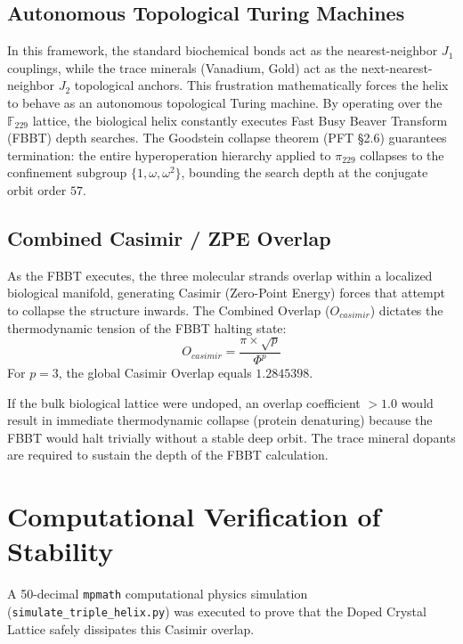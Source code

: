 \documentclass[12pt,oneside]{article}
\theoremstyle{principia}
\theoremstyle{definition}
\theoremstyle{remark}
\begin{document}
\subsection{Autonomous Topological Turing Machines}

In this framework, the standard biochemical bonds act as the nearest-neighbor $J_1$ couplings, while the trace minerals (Vanadium, Gold) act as the next-nearest-neighbor $J_2$ topological anchors. This frustration mathematically forces the helix to behave as an autonomous topological Turing machine. By operating over the $\mathbb{F}_{229}$ lattice, the biological helix constantly executes Fast Busy Beaver Transform (FBBT) depth searches. The Goodstein collapse theorem (PFT \S2.6) guarantees termination: the entire hyperoperation hierarchy applied to $\pi_{229}$ collapses to the confinement subgroup $\{1, \omega, \omega^2\}$, bounding the search depth at the conjugate orbit order $57$.

\subsection{Combined Casimir / ZPE Overlap}
As the FBBT executes, the three molecular strands overlap within a localized biological manifold, generating Casimir (Zero-Point Energy) forces that attempt to collapse the structure inwards. The Combined Overlap ($O_{casimir}$) dictates the thermodynamic tension of the FBBT halting state:
\begin{equation}
    O_{casimir} = \frac{\pi \times \sqrt{p}}{\Phi^p}
\end{equation}
For $p=3$, the global Casimir Overlap equals $\mathbf{1.2845398}$.

If the bulk biological lattice were undoped, an overlap coefficient $> 1.0$ would result in immediate thermodynamic collapse (protein denaturing) because the FBBT would halt trivially without a stable deep orbit. The trace mineral dopants are required to sustain the depth of the FBBT calculation.

\section{Computational Verification of Stability}

A 50-decimal \texttt{mpmath} computational physics simulation (\texttt{simulate\_triple\_helix.py}) was executed to prove that the Doped Crystal Lattice safely dissipates this Casimir overlap.
\end{document}
